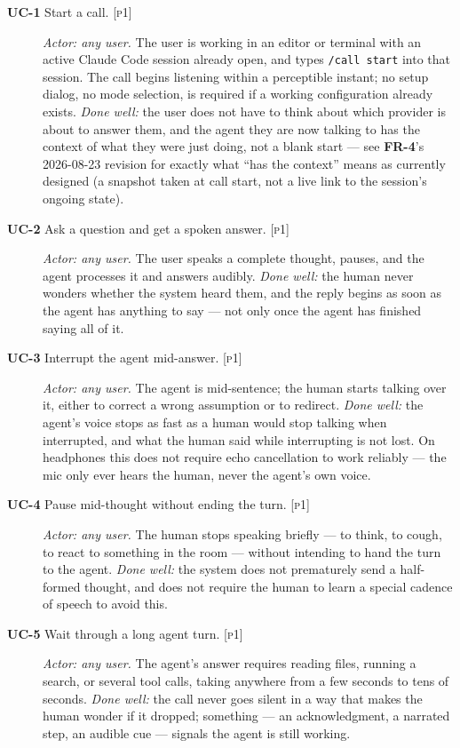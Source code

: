 \documentclass[a4paper,11pt]{report}
\newcommand{\uc}[1]{\textbf{UC-#1}}
\newcommand{\fr}[1]{\textbf{FR-#1}}
\newcommand{\pone}{\textsc{[p1]}}
\begin{document}
\begin{description}

\item[\uc{1} Start a call. \pone{}] \emph{Actor: any user.} The user is
  working in an editor or terminal with an active Claude Code session
  already open, and types \texttt{/call start} into that session. The
  call begins listening
  within a perceptible instant; no setup dialog, no mode selection, is
  required if a working configuration already exists. \emph{Done well:} the
  user does not have to think about which provider is about to answer them,
  and the agent they are now talking to has the context of what they were
  just doing, not a blank start --- see \fr{4}'s 2026-08-23 revision for
  exactly what ``has the context'' means as currently designed (a
  snapshot taken at call start, not a live link to the session's ongoing
  state).

\item[\uc{2} Ask a question and get a spoken answer. \pone{}] \emph{Actor:
  any user.} The user speaks a complete thought, pauses, and the agent
  processes it and answers audibly. \emph{Done well:} the human never
  wonders whether the system heard them, and the reply begins as soon as
  the agent has anything to say --- not only once the agent has finished
  saying all of it.

\item[\uc{3} Interrupt the agent mid-answer. \pone{}] \emph{Actor: any
  user.} The agent is mid-sentence; the human starts talking over it,
  either to correct a wrong assumption or to redirect. \emph{Done well:}
  the agent's voice stops as fast as a human would stop talking when
  interrupted, and what the human said while interrupting is not lost. On
  headphones this does not require echo cancellation to work reliably ---
  the mic only ever hears the human, never the agent's own voice.

\item[\uc{4} Pause mid-thought without ending the turn. \pone{}]
  \emph{Actor: any user.} The human stops speaking briefly --- to think, to
  cough, to react to something in the room --- without intending to hand
  the turn to the agent. \emph{Done well:} the system does not prematurely
  send a half-formed thought, and does not require the human to learn a
  special cadence of speech to avoid this.

\item[\uc{5} Wait through a long agent turn. \pone{}] \emph{Actor: any
  user.} The agent's answer requires reading files, running a search, or
  several tool calls, taking anywhere from a few seconds to tens of
  seconds. \emph{Done well:} the call never goes silent in a way that
  makes the human wonder if it dropped; something --- an acknowledgment, a
  narrated step, an audible cue --- signals the agent is still working.


\end{description}
\end{document}
